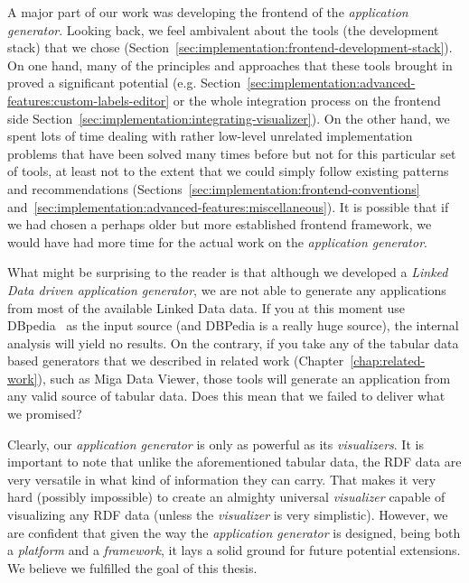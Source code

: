 A major part of our work was developing the frontend of the \emph{application generator}. Looking back, we feel ambivalent about the tools (the development stack) that we chose (Section~\ref{sec:implementation:frontend-development-stack}). On one hand, many of the principles and approaches that these tools brought in proved a significant potential (e.g. Section~\ref{sec:implementation:advanced-features:custom-labels-editor} or the whole integration process on the frontend side Section~\ref{sec:implementation:integrating-visualizer}). On the other hand, we spent lots of time dealing with rather low-level unrelated implementation problems that have been solved many times before but not for this particular set of tools, at least not to the extent that we could simply follow existing patterns and recommendations (Sections~\ref{sec:implementation:frontend-conventions} and~\ref{sec:implementation:advanced-features:miscellaneous}). It is possible that if we had chosen a perhaps older but more established frontend framework, we would have had more time for the actual work on the \emph{application generator}.

What might be surprising to the reader is that although we developed a \emph{Linked Data driven application generator}, we are not able to generate any applications from most of the available Linked Data data. If you at this moment use DBpedia~\cite{dbpedia} as the input source (and DBPedia is a really huge source), the internal analysis will yield no results. On the contrary, if you take any of the tabular data based generators that we described in related work (Chapter~\ref{chap:related-work}), such as Miga Data Viewer, those tools will generate an application from any valid source of tabular data. Does this mean that we failed to deliver what we promised?

Clearly, our \emph{application generator} is only as powerful as its \emph{visualizers}. It is important to note that unlike the aforementioned tabular data, the RDF data are very versatile in what kind of information they can carry. That makes it very hard (possibly impossible) to create an almighty universal \emph{visualizer} capable of visualizing any RDF data (unless the \emph{visualizer} is very simplistic). However, we are confident that given the way the \emph{application generator} is designed, being both a \emph{platform} and a \emph{framework}, it lays a solid ground for future potential extensions. We believe we fulfilled the goal of this thesis.
